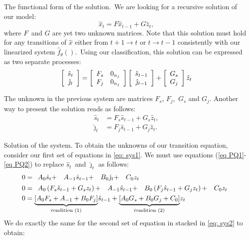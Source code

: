 \documentclass[a4paper,12pt]{article}%
\begin{document}
\textsf{The functional form of the solution.\ }We are looking for a recursive
solution of our model:%
\begin{equation}
\hat{x}_{t}=F\hat{x}_{t-1}+G\hat{z}_{t},
\end{equation}
where $F$\ and $G$ are yet two unknown matrices. Note that this solution must
hold for any transitions of $\hat{x}$ either from $t+1\rightarrow t$ or
$t\rightarrow t-1$ consistently with our linearized system $\hat{f}_{\theta
}()$.\ Using our classification, this solution can be expressed as two
separate processes:%
\begin{equation}
\left[
\begin{array}
[c]{c}%
\hat{s}_{t}\\
\hat{\jmath}_{t}%
\end{array}
\right]  =\left[
\begin{array}
[c]{cc}%
F_{s} & 0_{n_{j}}\\
F_{j} & 0_{n_{j}}%
\end{array}
\right]  \left[
\begin{array}
[c]{c}%
\hat{s}_{t-1}\\
\hat{\jmath}_{t-1}%
\end{array}
\right]  +\left[
\begin{array}
[c]{c}%
G_{s}\\
G_{j}%
\end{array}
\right]  \hat{z}_{t}%
\end{equation}


The unknown in the previous system are matrices $F_{s}$, $F_{j}$,\ $G_{s}$ and
$G_{j}$. Another way to present the solution reads as follows:%
\begin{align}
\hat{s}_{t}  &  =F_{s}\hat{s}_{t-1}+G_{s}\hat{z}_{t},\label{eq PQ1}\\
\hat{\jmath}_{t}  &  =F_{j}\hat{s}_{t-1}+G_{j}\hat{z}_{t}. \label{eq PQ2}%
\end{align}


\textsf{Solution of the system. }To obtain the unknowns of our transition
equation, consider our first set of equations in \autoref{eq: sys1}. We must
use equations (\ref{eq PQ1}-\ref{eq PQ2}) to replace $\hat{s}_{t}$\ and
$\hat{\jmath}_{t}$ as follows: \ \
\begin{align*}
0  &  =%
\begin{array}
[c]{cccc}%
A_{0}\hat{s}_{t}+ & A_{-1}\hat{s}_{t-1}+ & B_{0}\hat{\jmath}_{t}+ & C_{0}z_{t}%
\end{array}
\\
0  &  =%
\begin{array}
[c]{cccc}%
A_{0}\left(  F_{s}\hat{s}_{t-1}+G_{s}z_{t}\right)  + & A_{-1}\hat{s}_{t-1}+ &
B_{0}\left(  F_{j}\hat{s}_{t-1}+G_{j}z_{t}\right)  + & C_{0}z_{t}%
\end{array}
\\
0  &  =\underset{\text{condition (1)}}{\underbrace{\left[  A_{0}F_{s}%
+A_{-1}+B_{0}F_{j}\right]  }}\hat{s}_{t-1}+\underset{\text{condition (2)}%
}{\underbrace{\left[  A_{0}G_{s}+B_{0}G_{j}+C_{0}\right]  }}z_{t}%
\end{align*}
We do exactly the same for the second set of equation in stacked in
\autoref{eq: sys2} to obtain:%
\end{document}
